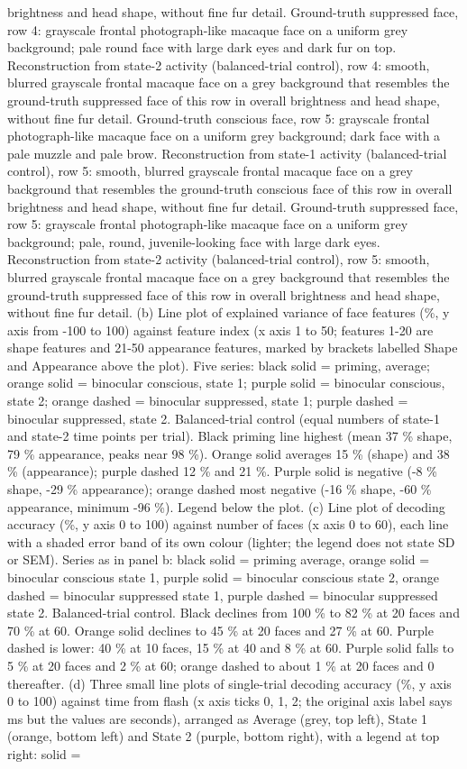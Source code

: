 \documentclass{article}
\begin{document}
brightness and head shape, without fine fur detail. Ground-truth suppressed face, row 4: grayscale frontal photograph-like macaque face on a uniform grey background; pale round face with large dark eyes and dark fur on top. Reconstruction from state-2 activity (balanced-trial control), row 4: smooth, blurred grayscale frontal macaque face on a grey background that resembles the ground-truth suppressed face of this row in overall brightness and head shape, without fine fur detail. Ground-truth conscious face, row 5: grayscale frontal photograph-like macaque face on a uniform grey background; dark face with a pale muzzle and pale brow. Reconstruction from state-1 activity (balanced-trial control), row 5: smooth, blurred grayscale frontal macaque face on a grey background that resembles the ground-truth conscious face of this row in overall brightness and head shape, without fine fur detail. Ground-truth suppressed face, row 5: grayscale frontal photograph-like macaque face on a uniform grey background; pale, round, juvenile-looking face with large dark eyes. Reconstruction from state-2 activity (balanced-trial control), row 5: smooth, blurred grayscale frontal macaque face on a grey background that resembles the ground-truth suppressed face of this row in overall brightness and head shape, without fine fur detail. (b) Line plot of explained variance of face features (\%, y axis from -100 to 100) against feature index (x axis 1 to 50; features 1-20 are shape features and 21-50 appearance features, marked by brackets labelled Shape and Appearance above the plot). Five series: black solid = priming, average; orange solid = binocular conscious, state 1; purple solid = binocular conscious, state 2; orange dashed = binocular suppressed, state 1; purple dashed = binocular suppressed, state 2. Balanced-trial control (equal numbers of state-1 and state-2 time points per trial). Black priming line highest (mean 37 \% shape, 79 \% appearance, peaks near 98 \%). Orange solid averages 15 \% (shape) and 38 \% (appearance); purple dashed 12 \% and 21 \%. Purple solid is negative (-8 \% shape, -29 \% appearance); orange dashed most negative (-16 \% shape, -60 \% appearance, minimum -96 \%). Legend below the plot. (c) Line plot of decoding accuracy (\%, y axis 0 to 100) against number of faces (x axis 0 to 60), each line with a shaded error band of its own colour (lighter; the legend does not state SD or SEM). Series as in panel b: black solid = priming average, orange solid = binocular conscious state 1, purple solid = binocular conscious state 2, orange dashed = binocular suppressed state 1, purple dashed = binocular suppressed state 2. Balanced-trial control. Black declines from 100 \% to 82 \% at 20 faces and 70 \% at 60. Orange solid declines to 45 \% at 20 faces and 27 \% at 60. Purple dashed is lower: 40 \% at 10 faces, 15 \% at 40 and 8 \% at 60. Purple solid falls to 5 \% at 20 faces and 2 \% at 60; orange dashed to about 1 \% at 20 faces and 0 thereafter. (d) Three small line plots of single-trial decoding accuracy (\%, y axis 0 to 100) against time from flash (x axis ticks 0, 1, 2; the original axis label says ms but the values are seconds), arranged as Average (grey, top left), State 1 (orange, bottom left) and State 2 (purple, bottom right), with a legend at top right: solid = 
\end{document}
